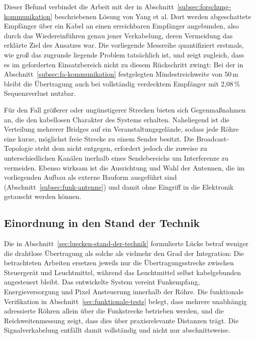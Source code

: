 Dieser Befund verbindet die Arbeit mit der in
Abschnitt~\ref{subsec:forschung-kommunikation} beschriebenen Lösung von Yang et al.
Dort werden abgeschattete Empfänger über ein Kabel an einen erreichbaren Empfänger
angebunden, also durch das Wiedereinführen genau jener Verkabelung, deren
Vermeidung das erklärte Ziel des Ansatzes war. Die vorliegende Messreihe
quantifiziert erstmals, wie groß das zugrunde liegende Problem tatsächlich ist,
und zeigt zugleich, dass es im geforderten Einsatzbereich nicht zu diesem
Rückschritt zwingt: Bei der in Abschnitt~\ref{subsec:fa-kommunikation}
festgelegten Mindestreichweite von 50\,m bleibt die Übertragung auch bei
vollständig verdecktem Empfänger mit 2,08\,\% Sequenzverlust nutzbar.

Für den Fall größerer oder ungünstigerer Strecken bieten sich Gegenmaßnahmen an,
die den kabellosen Charakter des Systems erhalten. Naheliegend ist die Verteilung
mehrerer Bridges auf ein Veranstaltungsgelände, sodass jede Röhre eine kurze,
möglichst freie Strecke zu einem Sender besitzt. Die Broadcast-Topologie steht dem
nicht entgegen, erfordert jedoch die zuweise zu unterschiedlichen Kanälen 
inerhalb eines Sendebereichs um Interferenze zu vermeiden.
Ebenso wirksam ist die Ausrichtung und
Wahl der Antennen, die im vorliegenden Aufbau als externe Bauform ausgeführt sind
(Abschnitt~\ref{subsec:funk-antenne}) und damit ohne Eingriff in die Elektronik
getauscht werden können.

\subsection{Einordnung in den Stand der Technik}
\label{subsec:diskussion-einordnung}

Die in Abschnitt~\ref{sec:luecken-stand-der-technik} formulierte Lücke betraf
weniger die drahtlose Übertragung als solche als vielmehr den Grad der
Integration: Die betrachteten Arbeiten ersetzen jeweils nur die Übertragungsstrecke
zwischen Steuergerät und Leuchtmittel, während das Leuchtmittel selbst
kabelgebunden angesteuert bleibt. Das entwickelte System vereint Funkempfang,
Energieversorgung und Pixel Ansteuerung innerhalb der Röhre. Die
funktionale Verifikation in Abschnitt~\ref{sec:funktionale-tests} belegt, dass
mehrere unabhängig adressierte Röhren allein über die Funkstrecke betrieben
werden, und die Reichweitenmessung zeigt, dass dies über praxisrelevante
Distanzen trägt. Die Signalverkabelung entfällt damit vollständig und nicht nur
abschnittsweise.


